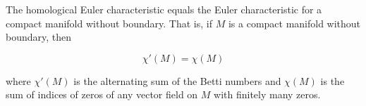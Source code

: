 The homological Euler characteristic equals the Euler characteristic for a compact manifold without boundary. That is, if $M$ is a compact manifold without boundary, then

$$\chi'(M) = \chi(M)$$

where $\chi'(M)$ is the alternating sum of the Betti numbers and $\chi(M)$ is the sum of indices of zeros of any vector field on $M$ with finitely many zeros.
